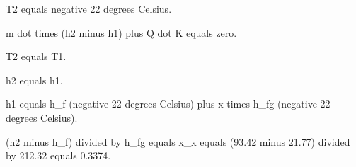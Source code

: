 T2 equals negative 22 degrees Celsius.  

m dot times (h2 minus h1) plus Q dot K equals zero.  

T2 equals T1.  

h2 equals h1.  

h1 equals h_f (negative 22 degrees Celsius) plus x times h_fg (negative 22 degrees Celsius).  

(h2 minus h_f) divided by h_fg equals x_x equals (93.42 minus 21.77) divided by 212.32 equals 0.3374.